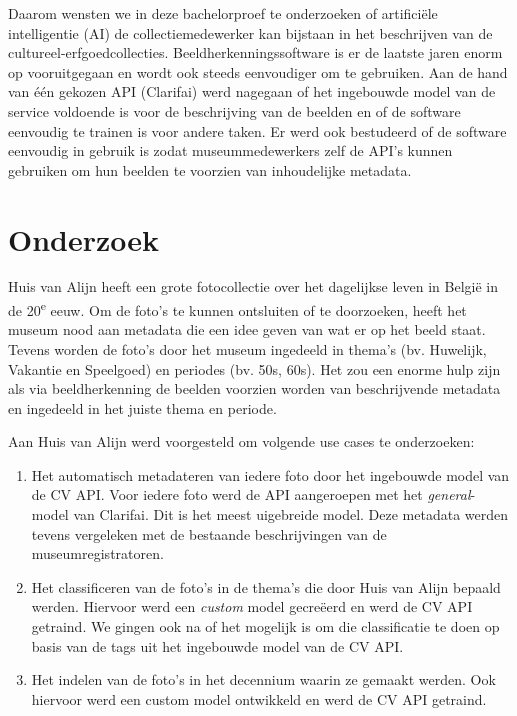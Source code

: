 \documentclass[a0,portrait]{a0poster}
\begin{document}
\begin{multicols}{2}
Daarom wensten we in deze bachelorproef te onderzoeken of artificiële intelligentie (AI) de collectiemedewerker kan bijstaan in het beschrijven van de cultureel-erfgoedcollecties. Beeldherkenningssoftware is er de laatste jaren enorm op vooruitgegaan en wordt ook steeds eenvoudiger om te gebruiken. Aan de hand van één gekozen API (Clarifai) werd nagegaan of het ingebouwde model van de service voldoende is voor de beschrijving van de beelden en of de software eenvoudig te trainen is voor andere taken. Er werd ook bestudeerd of de software eenvoudig in gebruik is zodat museummedewerkers zelf de API’s kunnen gebruiken om hun beelden te voorzien van inhoudelijke metadata.


\color{HoGentAccent1} 
\section*{Onderzoek}
\color{black}

Huis van Alijn heeft een grote fotocollectie over het dagelijkse leven in België in de 20\textsuperscript{e} eeuw. Om de foto’s te kunnen ontsluiten of te doorzoeken, heeft het museum nood aan metadata die een idee geven van wat er op het beeld staat. Tevens worden de foto’s door het museum ingedeeld in thema’s (bv. Huwelijk, Vakantie en Speelgoed) en periodes (bv. 50s, 60s). Het zou een enorme hulp zijn als via beeldherkenning de beelden voorzien worden van beschrijvende metadata en ingedeeld in het juiste thema en periode.

Aan Huis van Alijn werd voorgesteld om volgende use cases te onderzoeken:
\begin{enumerate}
    \item Het automatisch metadateren van iedere foto door het ingebouwde model van de CV API. Voor iedere foto werd de API aangeroepen met het \textit{general}-model van Clarifai. Dit is het meest uigebreide model. Deze metadata werden tevens vergeleken met de bestaande beschrijvingen van de museumregistratoren.
    \item Het classificeren van de foto’s in de thema’s die door Huis van Alijn bepaald werden. Hiervoor werd een \textit{custom} model gecreëerd en werd de CV API getraind. We gingen ook na of het mogelijk is om die classificatie te doen op basis van de tags uit het ingebouwde model van de CV API. 
    \item Het indelen van de foto’s in het decennium waarin ze gemaakt werden. Ook hiervoor werd een custom model ontwikkeld en werd de CV API getraind.
\end{enumerate}


\end{multicols}
\end{document}
